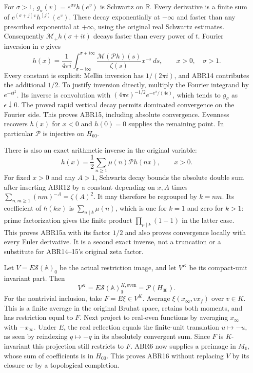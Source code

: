 \documentclass[11pt]{article}
\begin{document}
For $\sigma>1$, $g_\sigma(v)=e^{\sigma v}h(e^v)$ is Schwartz
on $\mathbb R$. Every derivative is a finite sum of
$e^{(\sigma+j)v}h^{(j)}(e^v)$. These decay exponentially at
$-\infty$ and faster than any prescribed exponential at
$+\infty$, using the original real Schwartz estimates.
Consequently $\mathcal M_+h(\sigma+it)$ decays faster than
every power of $t$. Fourier inversion in $v$ gives
\begin{equation}\tag{ABR15}
 h(x)=\frac1{4\pi i}
   \int_{\sigma-i\infty}^{\sigma+i\infty}
      \frac{\mathcal M(\mathcal P h)(s)}{\zeta(s)}x^{-s}\,ds,
       \qquad x>0,\quad\sigma>1.
\end{equation}
Every constant is explicit: Mellin inversion has $1/(2\pi i)$,
and ABR14 contributes the additional $1/2$. To justify inversion
directly, multiply the Fourier integrand by $e^{-\epsilon t^2}$.
Its inverse is convolution with
$(4\pi\epsilon)^{-1/2}e^{-v^2/(4\epsilon)}$, which tends to
$g_\sigma$ as $\epsilon\downarrow0$. The proved rapid vertical
decay permits dominated convergence on the Fourier side. This
proves ABR15, including absolute convergence. Evenness recovers
$h(x)$ for $x<0$ and $h(0)=0$ supplies the remaining point.
In particular $\mathcal P$ is injective on $H_{00}$.

There is also an exact arithmetic inverse in the original variable:
\begin{equation}\tag{ABR15a}
 h(x)=\frac12\sum_{n\ge1}\mu(n)\mathcal P h(nx),\qquad x>0.
\end{equation}
For fixed $x>0$ and any $A>1$, Schwartz decay bounds the absolute
double sum after inserting ABR12 by a constant depending on $x,A$
times $\sum_{n,m\ge1}(nm)^{-A}=\zeta(A)^2$.
It may therefore be regrouped by $k=nm$. Its coefficient of $h(kx)$
is $\sum_{n\mid k}\mu(n)$, which is one for $k=1$ and zero for
$k>1$: prime factorization gives the finite product
$\prod_{p\mid k}(1-1)$ in the latter case. This proves ABR15a
with its factor $1/2$ and also proves convergence locally with
every Euler derivative. It is a second exact inverse, not a
truncation or a substitute for ABR14--15's original zeta factor.

Let $V=E\mathcal S(\mathbb A)_0$ be the actual restriction image,
and let $V^K$ be its compact-unit invariant part. Then
\begin{equation}\tag{ABR16}
 V^K=E\mathcal S(\mathbb A)_0^{K,\mathrm{even}}
      =\mathcal P(H_{00}).
\end{equation}
For the nontrivial inclusion, take $F=E\xi\in V^K$. Average
$\xi(x_\infty,vx_f)$ over $v\in K$. This is a finite average
in the original Bruhat space, retains both moments, and has
restriction equal to $F$. Next project to real-even functions
by averaging $x_\infty$ with $-x_\infty$. Under $E$, the real
reflection equals the finite-unit translation $u\mapsto-u$,
as seen by reindexing $q\mapsto-q$ in its absolutely convergent
sum. Since $F$ is $K$-invariant this projection still restricts
to $F$. ABR6 now supplies a preimage in $M_0$, whose sum of
coefficients is in $H_{00}$. This proves ABR16 without replacing
$V$ by its closure or by a topological completion.
\end{document}
